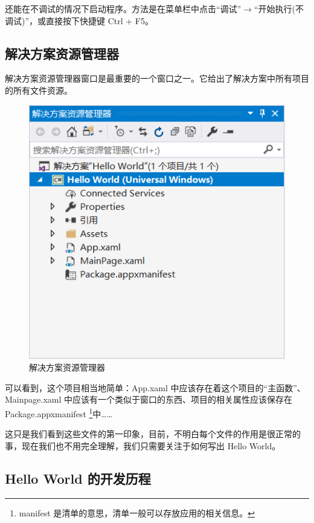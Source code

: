 还能在不调试的情况下启动程序。方法是在菜单栏中点击``调试''$\rightarrow$``开始执行(不调试)''，或直接按下快捷键 Ctrl + F5。

\subsection{解决方案资源管理器}

解决方案资源管理器窗口是最重要的一个窗口之一。它给出了解决方案中所有项目的所有文件资源。
\begin{figure}[htbp]
    \centering
    \includegraphics[width = 0.5\paperwidth]{pic/8.png}
    \caption{解决方案资源管理器}
\end{figure}

可以看到，这个项目相当地简单：App.xaml 中应该存在着这个项目的``主函数''、Mainpage.xaml 中应该有一个类似于窗口的东西、项目的相关属性应该保存在 Package.appxmanifest \footnote{manifest 是清单的意思，清单一般可以存放应用的相关信息。}中……

这只是我们看到这些文件的第一印象，目前，不明白每个文件的作用是很正常的事，现在我们也不用完全理解，我们只需要关注于如何写出 Hello World。

\subsection{Hello World 的开发历程}

